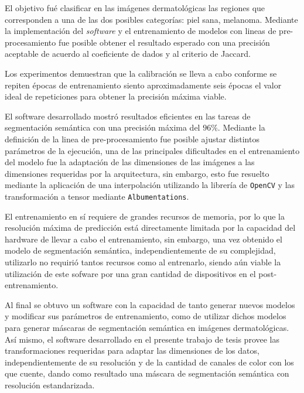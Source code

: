 El objetivo fué clasificar en las imágenes dermatológicas las regiones que corresponden a una de las dos posibles categorías: piel sana, melanoma. Mediante la implementación del \emph{software} y el entrenamiento de modelos con lineas de pre-procesamiento fue posible obtener el resultado esperado con una precisión aceptable de acuerdo al coeficiente de dados y al criterio de Jaccard.

Los experimentos demuestran que la calibración se lleva a cabo conforme se repiten épocas de entrenamiento siento aproximadamente seis épocas el valor ideal de repeticiones para obtener la precisión máxima viable.

El software desarrollado mostró resultados eficientes en las tareas de segmentación semántica con una precisión máxima del $96\%$. Mediante la definición de la linea de pre-procesamiento fue posible ajustar distintos parámetros de la ejecución, una de las principales dificultades en el entrenamiento del modelo fue la adaptación de las dimensiones de las imágenes a las dimensiones requeridas por la arquitectura, sin embargo, esto fue resuelto mediante la aplicación de una interpolación utilizando la librería de \texttt{OpenCV} y las transformación a tensor mediante \texttt{Albumentations}.

El entrenamiento en sí requiere de grandes recursos de memoria, por lo que la resolución máxima de predicción está directamente limitada por la capacidad del hardware de llevar a cabo el entrenamiento, sin embargo, una vez obtenido el modelo de segmentación semántica, independientemente de su complejidad, utilizarlo no requirió tantos recursos como al entrenarlo, siendo aún viable la utilización de este sofware por una gran cantidad de dispositivos en el post-entrenamiento. 


Al final se obtuvo un software con la capacidad de tanto generar nuevos modelos y modificar sus parámetros de entrenamiento, como de utilizar dichos modelos para generar máscaras de segmentación semántica en imágenes dermatológicas. Así mismo, el software desarrollado en el presente trabajo de tesis provee las transformaciones requeridas para adaptar las dimensiones de los datos, independientemente de su resolución y de la cantidad de canales de color con los que cuente, dando como resultado una máscara de segmentación semántica con resolución estandarizada.

